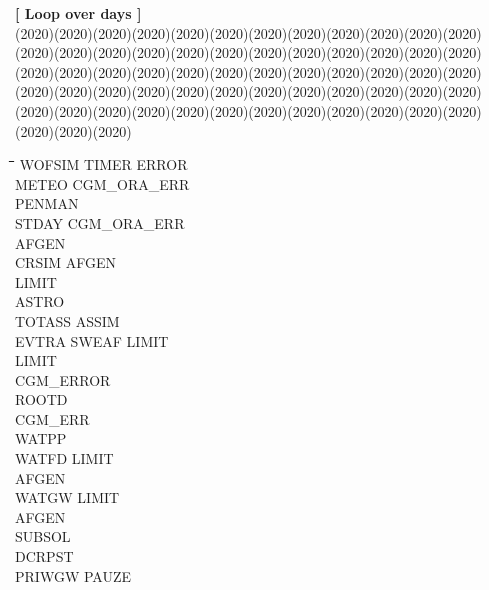 \documentclass[11pt]{article}
\begin{document}
\strut\hfill {\bf [ Loop over days ]}\\
 \GrBox(2020)\GrBox(2020)\GrBox(2020)\GrBox(2020)\GrBox(2020)\GrBox(2020)\GrBox(2020)\GrBox(2020)\GrBox(2020)\GrBox(2020)\GrBox(2020)\GrBox(2020)\GrBox(2020)\GrBox(2020)\GrBox(2020)\GrBox(2020)\GrBox(2020)\GrBox(2020)\GrBox(2020)\GrBox(2020)\GrBox(2020)\GrBox(2020)\GrBox(2020)\GrBox(2020)\GrBox(2020)\GrBox(2020)\GrBox(2020)\GrBox(2020)\GrBox(2020)\GrBox(2020)\GrBox(2020)\GrBox(2020)\GrBox(2020)\GrBox(2020)\GrBox(2020)\GrBox(2020)\GrBox(2020)\GrBox(2020)\GrBox(2020)\GrBox(2020)\GrBox(2020)\GrBox(2020)\GrBox(2020)\GrBox(2020)\GrBox(2020)\GrBox(2020)\GrBox(2020)\GrBox(2020)\GrBox(2020)\GrBox(2020)\GrBox(2020)\GrBox(2020)\GrBox(2020)\GrBox(2020)\GrBox(2020)\GrBox(2020)\GrBox(2020)\GrBox(2020)\GrBox(2020)\GrBox(2020)\GrBox(2020)\GrBox(2020)\GrBox(2020)\nwln
\begin{tabbing}
\hspace{1.27cm}\=\hspace{1.27cm}\=\hspace{1.27cm}\=\hspace{1.27cm}\=%
\hspace{1.27cm}\=\hspace{1.27cm}\=\hspace{1.27cm}\=\hspace{1.27cm}\=%
\hspace{1.27cm}\=\hspace{1.27cm}\=\kill
\>\> \> WOFSIM\> \> TIMER\> \> ERROR\\
\>\> \> \> \> METEO\> \> CGM\_ORA\_ERR\\
\>\> \> \> \> \> \> PENMAN\\
\>\> \> \> \> STDAY\> \> CGM\_ORA\_ERR\\
\>\> \> \> \> \> \> AFGEN\\
\>\> \> \> \> CRSIM\> \> AFGEN\\
\>\> \> \> \> \> \> LIMIT\\
\>\> \> \> \> \> \> ASTRO\\
\>\> \> \> \> \> \> TOTASS\> \> ASSIM\\
\>\> \> \> \> \> \> EVTRA\> \> SWEAF\> LIMIT\\
\>\> \> \> \> \> \> \> \> LIMIT\\
\>\> \> \> \> \> \> CGM\_ERROR\\
\>\> \> \> \> ROOTD\\
\>\> \> \> \> CGM\_ERR\\
\>\> \> \> \> WATPP\\
\>\> \> \> \> WATFD\> \> LIMIT\\
\>\> \> \> \> \> \> AFGEN\\
\>\> \> \> \> WATGW\> \> LIMIT\\
\>\> \> \> \> \> \> AFGEN\\
\>\> \> \> \> \> \> SUBSOL\\
\>\> \> \> \> DCRPST\\
\>\> \> \> \> PRIWGW\> \> PAUZE
\end{tabbing}
\end{document}
